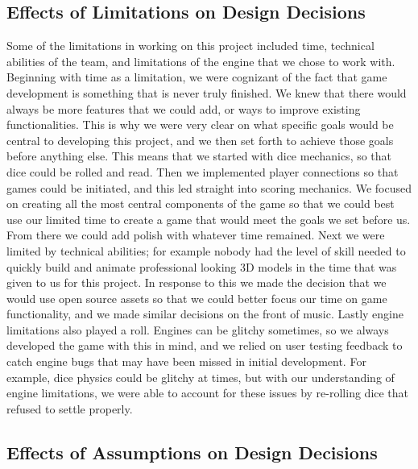 \documentclass{article}
\begin{document}
\subsection{Effects of Limitations on Design Decisions}

Some of the limitations in working on this project included time, technical abilities of the team, and limitations of the engine that we chose to work with. Beginning with time as a limitation, we were cognizant of the fact that game development is something that is never truly finished. We knew that there would always be more features that we could add, or ways to improve existing functionalities. This is why we were very clear on what specific goals would be central to developing this project, and we then set forth to achieve those goals before anything else. This means that we started with dice mechanics, so that dice could be rolled and read. Then we implemented player connections so that games could be initiated, and this led straight into scoring mechanics. We focused on creating all the most central components of the game so that we could best use our limited time to create a game that would meet the goals we set before us. From there we could add polish with whatever time remained. Next we were limited by technical abilities; for example nobody had the level of skill needed to quickly build and animate professional looking 3D models in the time that was given to us for this project. In response to this we made the decision that we would use open source assets so that we could better focus our time on game functionality, and we made similar decisions on the front of music. Lastly engine limitations also played a roll. Engines can be glitchy sometimes, so we always developed the game with this in mind, and we relied on user testing feedback to catch engine bugs that may have been missed in initial development. For example, dice physics could be glitchy at times, but with our understanding of engine limitations, we were able to account for these issues by re-rolling dice that refused to settle properly.

\subsection{Effects of Assumptions on Design Decisions}
\end{document}
